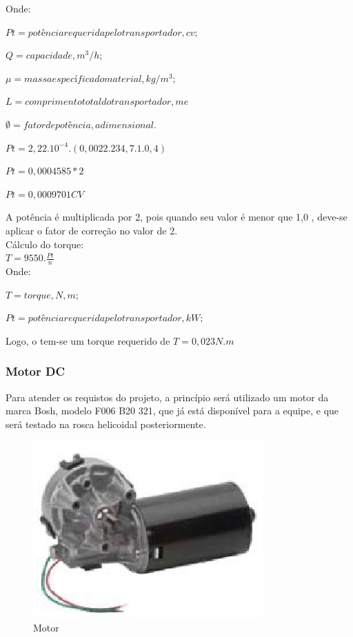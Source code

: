 Onde:

$Pt = potência requerida pelo transportador, cv;$

$Q = capacidade, m^3/h;$

$\mu = massa específica do material, kg/m^3;$

$L = comprimento total do transportador, m e$

$\emptyset = fator de potência, adimensional.$


\begin{center}
$Pt = 2,22.10^{-4}.(0,0022.234,7.1.0,4)$

$Pt = 0,0004585*2$

$Pt = 0,0009701 CV$

\end{center}

A potência é multiplicada por 2, pois quando seu valor é menor que 1,0 , deve-se aplicar o fator de correção no valor de 2.\\

Cálculo do torque:\\

$T=9550.\frac{Pt}{n}$\\

Onde:

$T = torque, N,m;$

$Pt = potência requerida pelo transportador, kW;$

Logo, o tem-se um torque requerido de $T=0,023N.m$

\subsubsection{Motor DC}

Para atender os requistos do projeto, a princípio será utilizado um motor da marca Bosh, modelo F006 B20 321, que já está disponível para a equipe, e que será testado na rosca helicoidal posteriormente.

\begin{figure}[H]
 \centering
   \includegraphics[keepaspectratio=true,scale=0.8]{figuras/motor2.eps}
 \caption{Motor}
 \label{motor2}
\end{figure}

